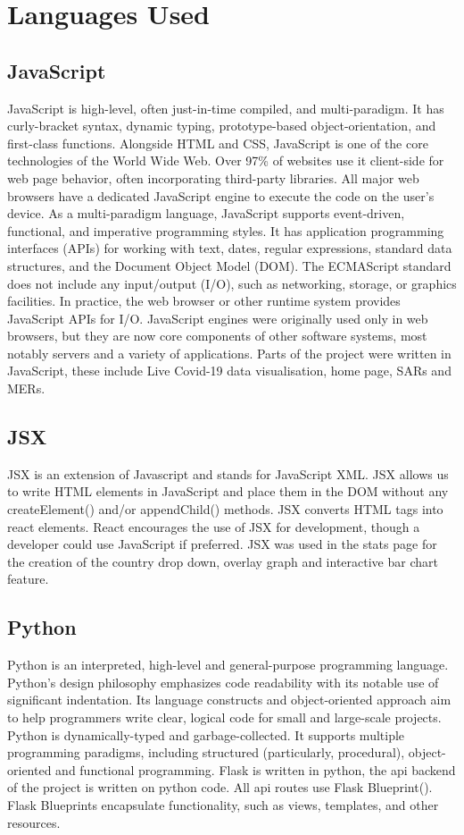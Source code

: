 \section{Languages Used}
\subsection{JavaScript}
JavaScript is high-level, often just-in-time compiled, and multi-paradigm. It has curly-bracket syntax, dynamic typing, prototype-based object-orientation, and first-class functions.
Alongside HTML and CSS, JavaScript is one of the core technologies of the World Wide Web. Over 97\% of websites use it client-side for web page behavior, often incorporating third-party libraries. All major web browsers have a dedicated JavaScript engine to execute the code on the user's device.
As a multi-paradigm language, JavaScript supports event-driven, functional, and imperative programming styles. It has application programming interfaces (APIs) for working with text, dates, regular expressions, standard data structures, and the Document Object Model (DOM).
The ECMAScript standard does not include any input/output (I/O), such as networking, storage, or graphics facilities. In practice, the web browser or other runtime system provides JavaScript APIs for I/O.
JavaScript engines were originally used only in web browsers, but they are now core components of other software systems, most notably servers and a variety of applications.\cite{javascript}
Parts of the project were written in JavaScript, these include Live Covid-19 data visualisation, home page, SARs and MERs. 
\subsection{JSX}
JSX is an extension of Javascript and stands for JavaScript XML.
JSX allows us to write HTML elements in JavaScript and place them in the DOM without any createElement()  and/or appendChild() methods. JSX converts HTML tags into react elements.\cite{jsx}
React encourages the use of JSX for development, though a developer could use JavaScript if preferred. JSX was used in the stats page for the creation of the country drop down, overlay graph and interactive bar chart feature. 
\subsection{Python}
Python is an interpreted, high-level and general-purpose programming language. Python's design philosophy emphasizes code readability with its notable use of significant indentation. Its language constructs and object-oriented approach aim to help programmers write clear, logical code for small and large-scale projects.
Python is dynamically-typed and garbage-collected. It supports multiple programming paradigms, including structured (particularly, procedural), object-oriented and functional programming.\cite{python}
Flask is written in python, the api backend of the project is written on python code. All api routes use Flask Blueprint().
Flask Blueprints encapsulate functionality, such as views, templates, and other resources.

